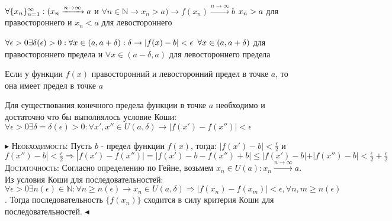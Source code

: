 \documentclass[14pt]{extreport}
\begin{document}
            \begin{definition}
                $\\ \forall \{x_n\}_{n=1}^{\infty}:(x_{n} \xrightarrow{n\rightarrow\infty}a $ и $\forall n \in \mathbb{N} \rightarrow x_n > a) \rightarrow f(x_n) \xrightarrow{n\rightarrow\infty}b$
                $\\ x_n > a $ для правостороннего и $x_n < a $ для левостороннего
            \end{definition}

            \begin{definition}
                $\\ \forall \epsilon > 0 \exists \delta(\epsilon) > 0: \forall x \in (a, a+\delta): \delta \rightarrow |f(x) - b| < \epsilon$
                $\\ \forall x \in (a, a+\delta)$ для правостороннего предела и $ \forall x \in (a-\delta, a)$ для левостороннего предела
            \end{definition}

            \begin{theorem}
                Если у функции $f(x)$ правосторонний и левосторонний предел в точке $a$, то она имеет предел в точке $a$
            \end{theorem}

            \begin{theorem}
                Для существования конечного предела функции в точке $a$ необходимо и достаточно что бы выполнялось условие Коши: $\forall \epsilon > 0 \exists \delta = \delta(\epsilon) > 0: \forall x', x'' \in U(a, \delta) \rightarrow |f(x') - f(x'')| < \epsilon$
            \end{theorem}

            $\blacktriangleright$ 
                \textsc{Необходимость:} Пусть $b$ - предел функции $f(x)$, тогда: $|f(x')-b| < \frac{\epsilon}{2}$ и $f(x'')-b| < \frac{\epsilon}{2} \Rightarrow |f(x') - f(x'')| = |f(x') -b -f(x'') + b| \leq |f(x') - b| + |f(x'') -b| < \frac{\epsilon}{2} + \frac{\epsilon}{2}$   \\ 
                \textsc{Достаточность:} Согласно определению по Гейне, возьмем $x_n \in U(a): x_n \xrightarrow{n\rightarrow \infty} a$. Из условия Коши для последовательностей: $\forall \epsilon >0 \exists n(\epsilon) \in \mathbb{N}: \forall n \geq n(\epsilon) \rightarrow x_n \in U(a, \delta) \Rightarrow |f(x_n) - f(x_m)| < \epsilon, \forall n,m \geq n(\epsilon)$. Тогда последовательность $\{f(x_n)\}$ сходится в силу критерия Коши для последовательностей. 
            $\blacktriangleleft$
\end{document}
